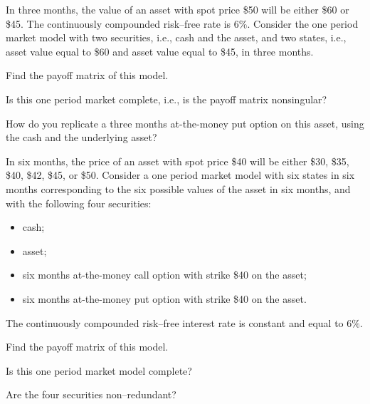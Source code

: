 \begin{exercises}
\item In three months, the value of an asset with spot price \$50 will be
either \$60 or \$45. The continuously compounded risk--free rate is
$6\%$. Consider the one period market model with two securities, i.e.,
cash and the asset, and two states, i.e., asset value equal to \$60 and
asset value equal to \$45, in three months.
\begin{subparts}
\item Find the payoff matrix of this model.
\item Is this one period market complete, i.e., is the payoff matrix
nonsingular?
\item How do you replicate a three months at-the-money put option on
this asset, using the cash and the underlying asset?
\end{subparts}

\item In six months, the price of an asset with spot price \$40 will be
either \$30, \$35, \$40, \$42, \$45, or \$50. Consider a one period
market model with six states in six months corresponding to the six
possible values of the asset in six months, and with the following four
securities:
\begin{itemize}
\item cash;
\item asset;
\item six months at-the-money call option with strike \$40 on the
asset;
\item six months at-the-money put option with strike \$40 on the asset.
\end{itemize}
The continuously compounded risk--free interest rate is constant and
equal to $6\%$.
\begin{subparts}
\item Find the payoff matrix of this model.
\item Is this one period market model complete?
\item Are the four securities non--redundant?
\end{subparts}

\end{exercises}
